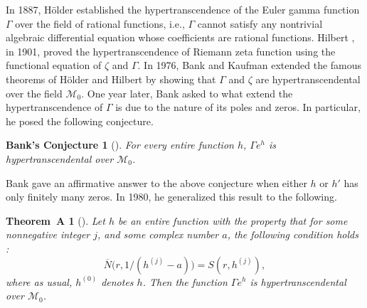 \documentclass[reqno,12pt]{amsart}
\newtheorem*{thmA}{Theorem~A}
\newtheorem*{conjB}{Bank's Conjecture}
\begin{document}
 

In 1887, H\"{o}lder \cite{Holder87} established the hypertranscendence of the Euler gamma function $\Gamma$ over the field of rational functions, i.e., $\Gamma$ cannot satisfy any nontrivial algebraic differential equation whose coefficients are rational functions.
Hilbert \cite{Hilbert01}, in 1901, proved the hypertranscendence of Riemann zeta function using the functional equation of $\zeta$ and $\Gamma$. 
 In 1976,  Bank and Kaufman \cite{Bank76} extended the famous theorems of  H\"{o}lder and Hilbert by showing that $\Gamma$ and $\zeta$ are hypertranscendental over the field $\mathcal{M}_0$. 
One year later, Bank \cite{Bank77} asked to what extend the hypertranscendence of $\Gamma$ is due to the nature of its poles and zeros. In particular, he posed the following conjecture.

\begin{conjB}[\cite{Bank77}]\label{conj:Bank}
For every entire function $h$,
$\Gamma e^h$ is hypertranscendental over $\mathcal{M}_0$.
\end{conjB}

Bank \cite{Bank77} gave an affirmative answer to the above conjecture when either $h$ or $h'$ has only finitely many zeros. In 1980, he \cite{Bank80} generalized this result to the following.

 \begin{thmA}[\cite{Bank80}]\label{thm:A}
 Let $h$ be an entire function with the property that for some nonnegative integer $j$, 
and some complex number $a$, the following condition holds : 
\begin{equation}\label{eqn:B}
\overline N \big (r, 1/(h^{(j)} - a)\big ) = S(r, h^{(j)}),
\end{equation}
where as usual, $h^{(0)}$ denotes $h$. Then the function $\Gamma e^{h}$ is hypertranscendental over $\mathcal{M}_0$. 
 \end{thmA}
 
\end{document}
